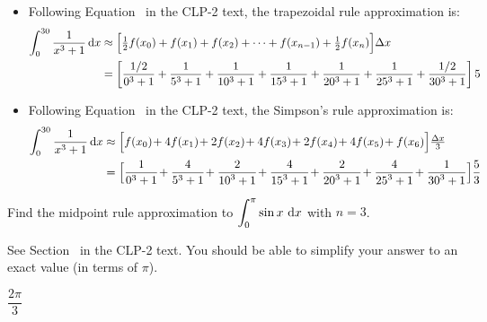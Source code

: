 \begin{solution}
\begin{itemize}
 \item
  Following Equation~ in the CLP-2 text, the trapezoidal rule approximation is:
\begin{align*}
\int_0^{30} \frac{1}{x^3+1}\,\mathrm{d}x
&\approx\Big[\tfrac{1}{2} f(x_0)+f(x_1)+f(x_2)+\cdots+ f(x_{n-1})+\tfrac{1}{2} f(x_n)\Big]\Delta x\\
&=\left[
\frac{1/2}{0^3+1}+
\frac{1}{5^3+1}+
\frac{1}{10^3+1}+
\frac{1}{15^3+1}+
\frac{1}{20^3+1}+
\frac{1}{25^3+1}+
\frac{1/2}{30^3+1}
\right]5
\end{align*}

\item Following Equation~ in the CLP-2 text, the Simpson's rule approximation is:
\begin{align*}
\int_0^{30} \frac{1}{x^3+1}\,\dee{x}
&\approx\Big[f(x_0)\!+4f(x_1)\!+2f(x_2)\!+4f(x_3)\!+2f(x_4)\!+4f(x_{5})\!+ f(x_6)\Big]\tfrac{\De x}{3}\\
&=\Big[\frac{1}{{0}^3+1}\!+\frac{4}{{5}^3+1}\!+\frac{2}{{10}^3+1}\!+\frac{4}{{15}^3+1}\!+\frac{2}{{20}^3+1}\!+\frac{4}{{25}^3+1}\!+ \frac{1}{{30}^3+1}\Big]\frac{5}{3}
\end{align*}

\end{itemize}
\end{solution}


\begin{question}[M121 2012A]\label{prob_s1.11_int2}
Find the midpoint rule approximation to $\displaystyle\int_0^\pi \sin x\ \mathrm{d}x$
with $n = 3$.
\end{question}

\begin{hint}
See Section~ in the
CLP-2 text. You should be able to simplify your answer to an exact value (in terms of $\pi$).
\end{hint}

\begin{answer}
$\dfrac{2\pi}{3}$
\end{answer}

